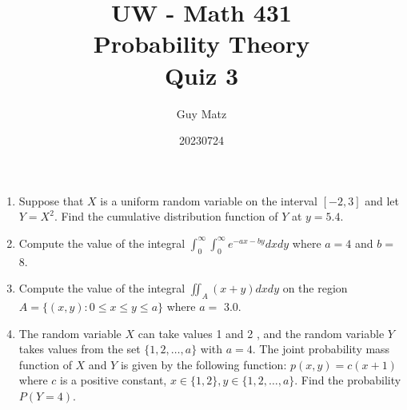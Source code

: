 \documentclass[10pt]{article}
\title{UW - Math 431 \\
Probability Theory \\
Quiz 3}
\author{Guy Matz}
\date{20230724}
\begin{document}
\maketitle
\begin{enumerate}

  \item Suppose that $X$ is a uniform random variable on the interval $[-2,3]$ and let $Y=X^2$. Find the cumulative distribution function of $Y$ at $y=5.4$.

  \item Compute the value of the integral $\int_0^{\infty} \int_0^{\infty} e^{-a x-b y} d x d y$ where $a=4$ and $b=$
8.

  \item Compute the value of the integral $\iint_A(x+y) d x d y$ on the region $A=\{(x, y): 0 \leq x \leq y \leq a\}$ where $a=$ 3.0.

  \item The random variable $X$ can take values 1 and 2 , and the random variable $Y$ takes values from the set $\{1,2, \ldots, a\}$ with $a=4$. The joint probability mass function of $X$ and $Y$ is given by the following function:
$p(x, y)=c(x+1)$ where $c$ is a positive constant, $x \in\{1,2\}, y \in\{1,2, \ldots, a\}$. Find the probability $P(Y=4)$.
\end{enumerate}
\end{document}
